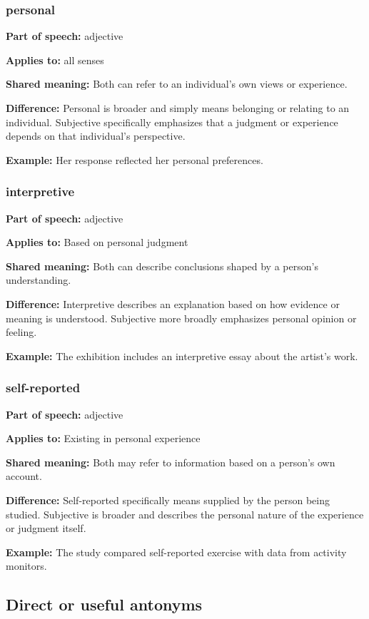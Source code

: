 \documentclass[11pt]{article}
\begin{document}
\subsubsection{personal}
\textbf{Part of speech:} adjective

\textbf{Applies to:} all senses

\textbf{Shared meaning:} Both can refer to an individual's own views or experience.

\textbf{Difference:} Personal is broader and simply means belonging or relating to an individual. Subjective specifically emphasizes that a judgment or experience depends on that individual's perspective.

\textbf{Example:} Her response reflected her personal preferences.

\subsubsection{interpretive}
\textbf{Part of speech:} adjective

\textbf{Applies to:} Based on personal judgment

\textbf{Shared meaning:} Both can describe conclusions shaped by a person's understanding.

\textbf{Difference:} Interpretive describes an explanation based on how evidence or meaning is understood. Subjective more broadly emphasizes personal opinion or feeling.

\textbf{Example:} The exhibition includes an interpretive essay about the artist's work.

\subsubsection{self-reported}
\textbf{Part of speech:} adjective

\textbf{Applies to:} Existing in personal experience

\textbf{Shared meaning:} Both may refer to information based on a person's own account.

\textbf{Difference:} Self-reported specifically means supplied by the person being studied. Subjective is broader and describes the personal nature of the experience or judgment itself.

\textbf{Example:} The study compared self-reported exercise with data from activity monitors.

\subsection{Direct or useful antonyms}
\end{document}
